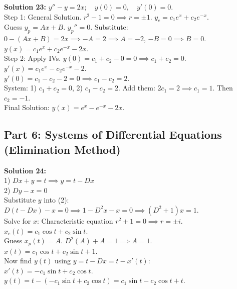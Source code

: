 \documentclass[11pt]{article}
\begin{document}
\textbf{Solution 23:} $y'' - y = 2x; \quad y(0) = 0, \quad y'(0) = 0$. \\
Step 1: General Solution. $r^2 - 1 = 0 \implies r = \pm 1$. $y_c = c_1 e^x + c_2 e^{-x}$. \\
Guess $y_p = Ax + B$. $y_p'' = 0$. Substitute: $0 - (Ax + B) = 2x \implies -A = 2 \implies A = -2$, $-B = 0 \implies B = 0$. \\
$y(x) = c_1 e^x + c_2 e^{-x} - 2x$. \\
Step 2: Apply IVs. $y(0) = c_1 + c_2 - 0 = 0 \implies c_1 + c_2 = 0$. \\
$y'(x) = c_1 e^x - c_2 e^{-x} - 2$. \\
$y'(0) = c_1 - c_2 - 2 = 0 \implies c_1 - c_2 = 2$. \\
System: 1) $c_1 + c_2 = 0$, 2) $c_1 - c_2 = 2$. Add them: $2c_1 = 2 \implies c_1 = 1$. Then $c_2 = -1$. \\
Final Solution: $y(x) = e^x - e^{-x} - 2x$.

\subsection*{Part 6: Systems of Differential Equations (Elimination Method)}

\textbf{Solution 24:} \\
1) $Dx + y = t \implies y = t - Dx$ \\
2) $Dy - x = 0$ \\
Substitute $y$ into (2): $D(t - Dx) - x = 0 \implies 1 - D^2x - x = 0 \implies (D^2 + 1)x = 1$. \\
Solve for $x$: Characteristic equation $r^2 + 1 = 0 \implies r = \pm i$. $x_c(t) = c_1 \cos t + c_2 \sin t$. \\
Guess $x_p(t) = A$. $D^2(A) + A = 1 \implies A = 1$. \\
$x(t) = c_1 \cos t + c_2 \sin t + 1$. \\
Now find $y(t)$ using $y = t - Dx = t - x'(t)$: \\
$x'(t) = -c_1 \sin t + c_2 \cos t$. \\
$y(t) = t - (-c_1 \sin t + c_2 \cos t) = c_1 \sin t - c_2 \cos t + t$.
\end{document}
